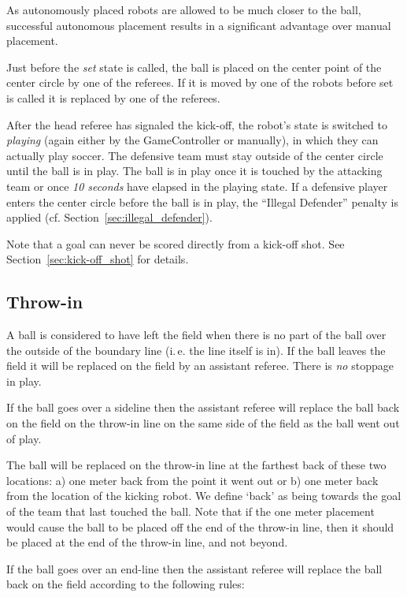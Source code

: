 \documentclass[12pt]{article}
\newcommand{\ie}{\mbox{i.\,e.}\xspace}
\newcommand{\cf}{\mbox{cf.}\xspace}
\begin{document}
As autonomously placed robots are allowed to be much closer to the ball, successful autonomous placement results in a significant advantage over manual placement.

Just before the \emph{set} state is called, the ball is placed on the center point of the center circle by one of the referees. If it is moved by one of the robots before set is called it is replaced by one of the referees.

After the head referee has signaled the kick-off, the robot's state is switched to \emph{playing} (again either by the GameController or manually), in which they can actually play soccer.
The defensive team must stay outside of the center circle until the ball is in play.  The ball is in play once it is touched by the attacking team or once \emph{10 seconds} have elapsed in the playing state. If a defensive player enters the center circle before the ball is in play, the ``Illegal Defender'' penalty is applied (\cf Section~\ref{sec:illegal_defender}).

Note that a goal can never be scored directly from a kick-off shot. See Section~\ref{sec:kick-off_shot} for details.

\subsection{Throw-in}
\label{sec:throw_in}

A ball is considered to have left the field when there is no part of the ball over the outside of the boundary line (\ie the line itself is in). If the ball leaves the field it will be replaced on the field by an assistant referee. There is \emph{no} stoppage in play.

If the ball goes over a sideline then the assistant referee will replace the ball back on the field on the throw-in line on the same side of the field as the ball went out of play.

The ball will be replaced on the throw-in line at the farthest back of these two locations: a) one meter back from the point it went out or b) one meter back from the location of the kicking robot. We define `back' as being towards the goal of the team that last touched the ball. Note that if the one meter placement would cause the ball to be placed off the end of the throw-in line, then it should be placed at the end of the throw-in line, and not beyond.

If the ball goes over an end-line then the assistant referee will replace the ball back on the field according to the following rules:
\end{document}
